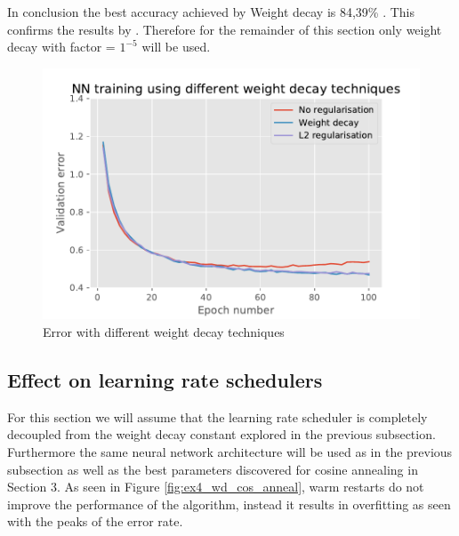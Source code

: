 \documentclass{article}
\begin{document}
In conclusion the best accuracy achieved by Weight decay is 84,39\% . This confirms the results by \citeauthor{loshchilov2018fixing}. Therefore for the remainder of this section only weight decay with factor = $1^{-5}$ will be used.
\begin{figure}[tb]
\vskip 5mm
\begin{center}
\centerline{\includegraphics[width=\columnwidth]{ex4_l2_vs_wd.pdf}}
\caption{Error with different weight decay techniques}
\label{fig:ex4_lw_vs_wd}
\end{center}
\vskip -5mm
\end{figure}

\subsection{Effect on learning rate schedulers}
For this section we will assume that the learning rate scheduler is completely decoupled from the weight decay constant explored in the previous subsection. Furthermore the same neural network architecture will be used as in the previous subsection as well as the best parameters discovered for cosine annealing in Section 3. As seen in Figure \ref{fig:ex4_wd_cos_anneal}, warm restarts do not improve the performance of the algorithm, instead it results in overfitting as seen with the peaks of the error rate.
\end{document}
